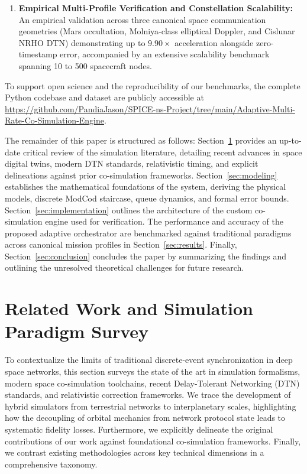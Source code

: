 \documentclass[a4paper,fleqn]{cas-sc}
\begin{document}
{\begin{enumerate}
    \item \textbf{Empirical Multi-Profile Verification and Constellation Scalability:} An empirical validation across three canonical space communication geometries (Mars occultation, Molniya-class elliptical Doppler, and Cislunar NRHO DTN) demonstrating up to $9.90\times$ acceleration alongside zero-timestamp error, accompanied by an extensive scalability benchmark spanning 10 to 500 spacecraft nodes.
\end{enumerate}

To support open science and the reproducibility of our benchmarks, the complete Python codebase and dataset are publicly accessible at \url{https://github.com/PandiaJason/SPICE-ns-Project/tree/main/Adaptive-Multi-Rate-Co-Simulation-Engine}.}

The remainder of this paper is structured as follows: Section~\ref{sec:related} provides an up-to-date critical review of the simulation literature, detailing recent advances in space digital twins, modern DTN standards, relativistic timing, and explicit delineations against prior co-simulation frameworks. Section~\ref{sec:modeling} establishes the mathematical foundations of the system, deriving the physical models, discrete ModCod staircase, queue dynamics, and formal error bounds. Section~\ref{sec:implementation} outlines the architecture of the custom co-simulation engine used for verification. The performance and accuracy of the proposed adaptive orchestrator are benchmarked against traditional paradigms across canonical mission profiles in Section~\ref{sec:results}. Finally, Section~\ref{sec:conclusion} concludes the paper by summarizing the findings and outlining the unresolved theoretical challenges for future research.

\section{Related Work and Simulation Paradigm Survey}
\label{sec:related}

To contextualize the limits of traditional discrete-event synchronization in deep space networks, this section surveys the state of the art in simulation formalisms, modern space co-simulation toolchains, recent Delay-Tolerant Networking (DTN) standards, and relativistic correction frameworks. We trace the development of hybrid simulators from terrestrial networks to interplanetary scales, highlighting how the decoupling of orbital mechanics from network protocol state leads to systematic fidelity losses. Furthermore, we explicitly delineate the original contributions of our work against foundational co-simulation frameworks. Finally, we contrast existing methodologies across key technical dimensions in a comprehensive taxonomy.
\end{document}

